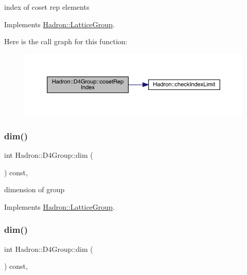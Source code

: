 index of coset rep elements 

Implements \mbox{\hyperlink{structHadron_1_1LatticeGroup_a7e3b9b5e2f596e6c40d64aa939a3ad6c}{Hadron\+::\+Lattice\+Group}}.

Here is the call graph for this function\+:
\nopagebreak
\begin{figure}[H]
\begin{center}
\leavevmode
\includegraphics[width=350pt]{de/d5e/structHadron_1_1D4Group_ae7ebfa25f82987479c33f0d5d769ab2f_cgraph}
\end{center}
\end{figure}
\mbox{\label{structHadron_1_1D4Group_a5969c3afe94d4c6ada166f7dc161a355}} 
\subsubsection{\texorpdfstring{dim()}{dim()}\hspace{0.1cm}{\footnotesize\ttfamily [1/2]}}
{\footnotesize\ttfamily int Hadron\+::\+D4\+Group\+::dim (\begin{DoxyParamCaption}{ }\end{DoxyParamCaption}) const\hspace{0.3cm}{\ttfamily [inline]}, {\ttfamily [virtual]}}

dimension of group 

Implements \mbox{\hyperlink{structHadron_1_1LatticeGroup_abd8415698323796ef6a8605796ee3bea}{Hadron\+::\+Lattice\+Group}}.

\mbox{\label{structHadron_1_1D4Group_a5969c3afe94d4c6ada166f7dc161a355}} 
\subsubsection{\texorpdfstring{dim()}{dim()}\hspace{0.1cm}{\footnotesize\ttfamily [2/2]}}
{\footnotesize\ttfamily int Hadron\+::\+D4\+Group\+::dim (\begin{DoxyParamCaption}{ }\end{DoxyParamCaption}) const\hspace{0.3cm}{\ttfamily [inline]}, {\ttfamily [virtual]}}

